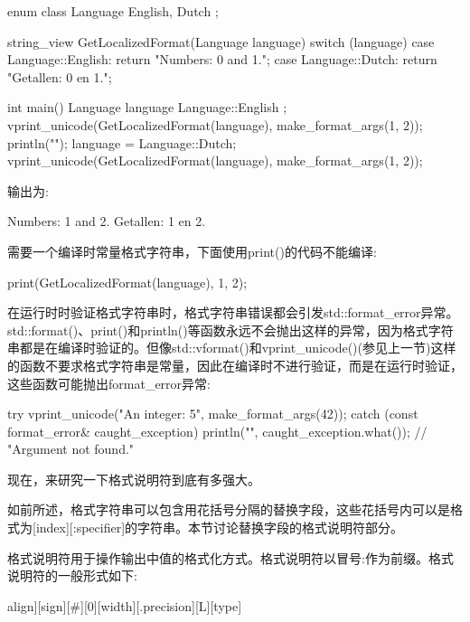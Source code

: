 \begin{cpp}
enum class Language { English, Dutch };

string_view GetLocalizedFormat(Language language)
{
    switch (language) {
        case Language::English: return "Numbers: {0} and {1}.";
        case Language::Dutch: return "Getallen: {0} en {1}.";
    }
}

int main()
{
    Language language { Language::English };
    vprint_unicode(GetLocalizedFormat(language), make_format_args(1, 2));
    println("");
    language = Language::Dutch;
    vprint_unicode(GetLocalizedFormat(language), make_format_args(1, 2));
}
\end{cpp}

输出为:

\begin{shell}
Numbers: 1 and 2.
Getallen: 1 en 2.
\end{shell}

需要一个编译时常量格式字符串，下面使用print()的代码不能编译:

\begin{cpp}
print(GetLocalizedFormat(language), 1, 2);
\end{cpp}


在运行时时验证格式字符串时，格式字符串错误都会引发std::format\_error异常。std::format()、print()和println()等函数永远不会抛出这样的异常，因为格式字符串都是在编译时验证的。但像std::vformat()和vprint\_unicode()(参见上一节)这样的函数不要求格式字符串是常量，因此在编译时不进行验证，而是在运行时验证，这些函数可能抛出format\_error异常:

\begin{cpp}
try {
    vprint_unicode("An integer: {5}", make_format_args(42));
} catch (const format_error& caught_exception) {
    println("{}", caught_exception.what()); // "Argument not found."
}
\end{cpp}

现在，来研究一下格式说明符到底有多强大。


如前所述，格式字符串可以包含用花括号分隔的替换字段，这些花括号内可以是格式为[index][:specifier]的字符串。本节讨论替换字段的格式说明符部分。

格式说明符用于操作输出中值的格式化方式。格式说明符以冒号:作为前缀。格式说明符的一般形式如下:

\begin{shell}
[[fill]align][sign][#][0][width][.precision][L][type]
\end{shell}

